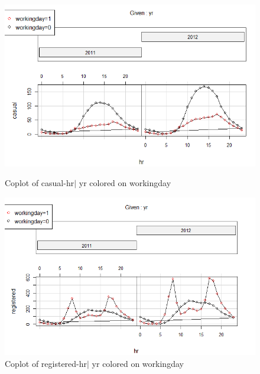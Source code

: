 \documentclass[12pt]{article}
\begin{document}
	\begin{figure}[H]
		\centering
		\begin{minipage}{.48\textwidth}
			\centering
			\includegraphics[width=\linewidth]{figures/casual_yr.png}
			\caption{Coplot of casual-hr$|$ yr colored on workingday}
		\end{minipage}%
		\begin{minipage}{.48\textwidth}
			\centering
			\includegraphics[width=\linewidth]{figures/registered_yr.png}
			\caption{Coplot of registered-hr$|$ yr colored on workingday}
		\end{minipage}
	\end{figure}
	
\end{document}

